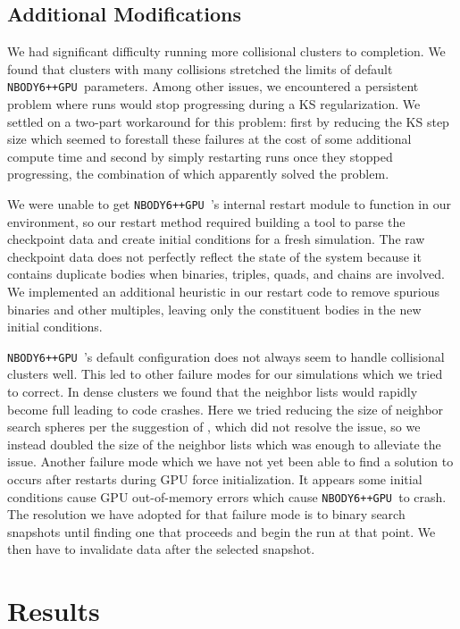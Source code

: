 \documentclass{princeton_astro_thesis}
\newcommand\nbody{\texttt{NBODY6++GPU }}
\numberwithin{equation}{section}
\begin{document}
\section{Additional Modifications}
We had significant difficulty running more collisional clusters to completion.  We found that clusters with many collisions stretched the limits of default \nbody parameters.  Among other issues, we encountered a persistent problem where runs would stop progressing during a KS regularization.  We settled on a two-part workaround for this problem: first by reducing the KS step size which seemed to forestall these failures at the cost of some additional compute time and second by simply restarting runs once they stopped progressing, the combination of which apparently solved the problem. 

We were unable to get \nbody's internal restart module to function in our environment, so our restart method required building a tool to parse the checkpoint data and create initial conditions for a fresh simulation.  The raw checkpoint data does not perfectly reflect the state of the system because it contains duplicate bodies when binaries, triples, quads, and chains are involved. We implemented an additional heuristic in our restart code to remove spurious binaries and other multiples, leaving only the constituent bodies in the new initial conditions.

\nbody's default configuration does not always seem to handle collisional clusters well. This led to other failure modes for our simulations which we tried to correct. In dense clusters we found that the neighbor lists would rapidly become full leading to code crashes.  Here we tried reducing the size of neighbor search spheres per the suggestion of \citet[][personal communication]{2017Wang}, which did not resolve the issue, so we instead doubled the size of the neighbor lists which was enough to alleviate the issue. Another failure mode which we have not yet been able to find a solution to occurs after restarts during GPU force initialization. It appears some initial conditions cause GPU out-of-memory errors which cause \nbody to crash. The resolution we have adopted for that failure mode is to binary search snapshots until finding one that proceeds and begin the run at that point.  We then have to invalidate data after the selected snapshot.

\chapter{Results} \label{ch:Results}
\end{document}

